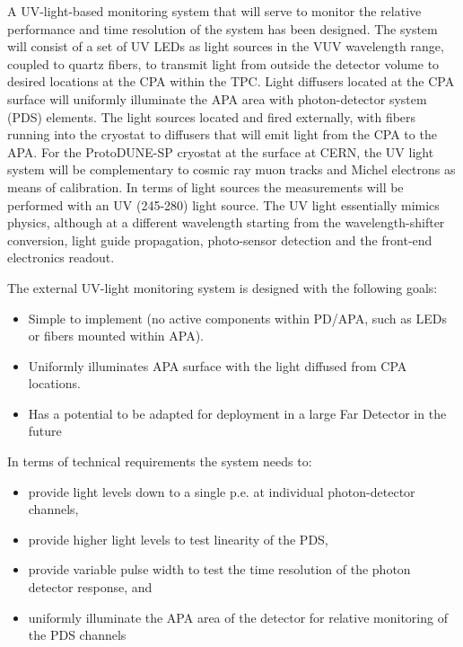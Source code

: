 A UV-light-based monitoring system that will serve to monitor the relative performance and time resolution of the system has been designed. %
The system will consist of a set of UV LEDs as light sources in the VUV wavelength range, coupled to quartz fibers, to transmit light from outside the detector volume to desired locations at the CPA within the TPC.
Light diffusers located at the CPA surface will uniformly illuminate the APA area with photon-detector system (PDS) elements.
The light sources located and fired externally, with fibers running into the cryostat to diffusers that will emit light from the CPA to the APA. 
For the ProtoDUNE-SP cryostat at the surface at CERN, the UV light system will be complementary to cosmic ray muon 
tracks and Michel electrons as means of calibration. In terms of light sources the measurements will be performed with an UV (245-280) light source.
The UV light essentially mimics physics, although at a different wavelength starting from the wavelength-shifter conversion, 
light guide propagation, photo-sensor detection and the front-end electronics readout.
	
The external UV-light monitoring system is designed with the following goals:
				
\begin{itemize}
\item Simple to implement (no active components within PD/APA, such as LEDs or fibers mounted within APA).
\item Uniformly illuminates APA surface with the light diffused from CPA locations.
\item Has a potential to be adapted for deployment in a large Far Detector in the future
\end{itemize}

In terms of technical requirements the system needs to:
\begin{itemize}
\item provide light levels down to a single p.e. at individual photon-detector channels,
\item provide higher light levels to test linearity of the PDS,
\item provide variable pulse width to test the time resolution of the photon detector response, and
\item uniformly illuminate the APA area of the detector for relative monitoring of the PDS channels
\end{itemize}

